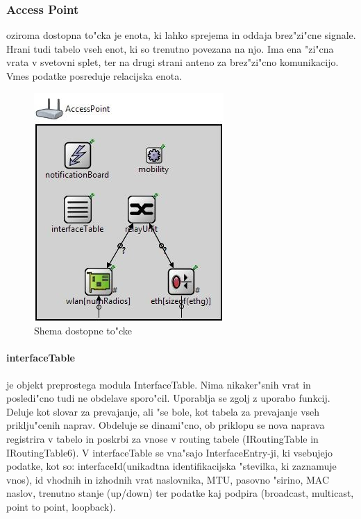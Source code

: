 \documentclass[a4paper,11pt]{article}
\begin{document}
\subsubsection{Access Point}
\label{description:acceesspoint}

oziroma dostopna to"cka je enota, ki lahko sprejema in oddaja brez"zi"cne signale. Hrani tudi tabelo vseh enot, ki so trenutno povezana na njo. Ima ena "zi"cna vrata v svetovni splet, ter na drugi strani anteno za brez"zi"cno komunikacijo. Vmes podatke posreduje relacijska enota. 

\begin{figure}[htbp]
    \begin{center}
        \includegraphics[scale=0.8]{img/ap.jpg}
        \caption{Shema dostopne to"cke}
	\label{image:ap}
    \end{center}
\end{figure}


\paragraph{interfaceTable}
\label{description:interfacetable}

je objekt preprostega modula InterfaceTable. Nima nikaker"snih vrat in posledi"cno tudi ne obdelave sporo"cil. Uporablja se zgolj z uporabo funkcij. Deluje kot slovar za prevajanje, ali "se bole, kot tabela za prevajanje vseh priklju"cenih naprav. Obdeluje se dinami"cno, ob priklopu se nova naprava registrira v tabelo in poskrbi za vnose v routing tabele (IRoutingTable in IRoutingTable6). V interfaceTable se vna"sajo InterfaceEntry-ji, ki vsebujejo podatke, kot so: interfaceId(unikadtna identifikacijska "stevilka, ki zaznamuje vnos), id vhodnih in izhodnih vrat naslovnika, MTU, pasovno "sirino, MAC naslov, trenutno stanje (up/down) ter podatke kaj podpira (broadcast, multicast, point to point, loopback).
\end{document}
